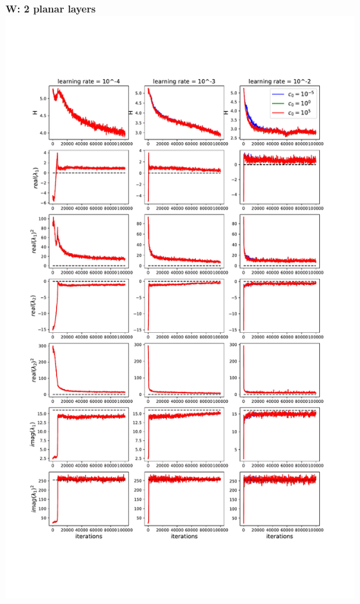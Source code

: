 \documentclass[11pt]{article}
\begin{document}
\clearpage
\begin{center}
\textbf{W: 2 planar layers} \\
\includegraphics[scale=.45]{images/learnW_2P.pdf} \\
\end{center}
\end{document}
